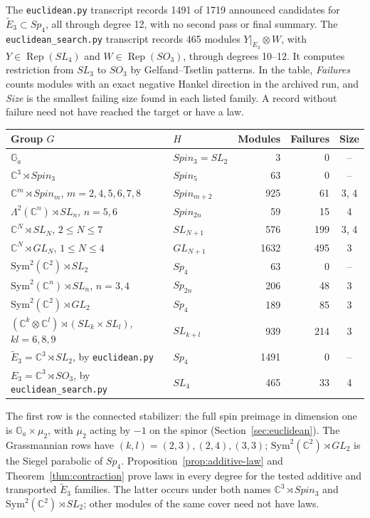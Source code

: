 \documentclass[11pt,reqno]{amsart}
\theoremstyle{definition}
\newcommand{\CC}{\mathbb C}
\newcommand{\Ga}{\mathbb G_a}
\newcommand{\Rep}{\operatorname{Rep}}
\begin{document}
The \texttt{euclidean.py} transcript records 1491 of 1719 announced candidates for $\widetilde E_3\subset Sp_4$, all through degree 12, with no second pass or final summary. The \texttt{euclidean\_search.py} transcript records 465 modules $Y|_{E_3}\otimes W$, with $Y\in\Rep(SL_4)$ and $W\in\Rep(SO_3)$, through degrees 10--12. It computes restriction from $SL_3$ to $SO_3$ by Gelfand--Tsetlin patterns. In the table, \emph{Failures} counts modules with an exact negative Hankel direction in the archived run, and \emph{Size} is the smallest failing size found in each listed family. A record without failure need not have reached the target or have a law.
\begin{center}\small
\begin{tabular}{@{}llrrc@{}}
\toprule
Group $G$ & $H$ & Modules & Failures & Size\\
\midrule
$\Ga$ & $Spin_3=SL_2$ & 3 & 0 & --\\
$\CC^3\rtimes Spin_3$ & $Spin_5$ & 63 & 0 & --\\
$\CC^m\rtimes Spin_m$, $m=2,4,5,6,7,8$ & $Spin_{m+2}$ & 925 & 61 & 3, 4\\
$\Lambda^2(\CC^n)\rtimes SL_n$, $n=5,6$ & $Spin_{2n}$ & 59 & 15 & 4\\
$\CC^N\rtimes SL_N$, $2\leq N\leq7$ & $SL_{N+1}$ & 576 & 199 & 3, 4\\
$\CC^N\rtimes GL_N$, $1\leq N\leq4$ & $GL_{N+1}$ & 1632 & 495 & 3\\
$\mathrm{Sym}^2(\CC^2)\rtimes SL_2$ & $Sp_4$ & 63 & 0 & --\\
$\mathrm{Sym}^2(\CC^n)\rtimes SL_n$, $n=3,4$ & $Sp_{2n}$ & 206 & 48 & 3\\
$\mathrm{Sym}^2(\CC^2)\rtimes GL_2$ & $Sp_4$ & 189 & 85 & 3\\
$(\CC^k\otimes\CC^l)\rtimes(SL_k\times SL_l)$, $kl=6,8,9$ & $SL_{k+l}$ & 939 & 214 & 3\\
$\widetilde E_3=\CC^3\rtimes SL_2$, by \texttt{euclidean.py} & $Sp_4$ & 1491 & 0 & --\\
$E_3=\CC^3\rtimes SO_3$, by \texttt{euclidean\_search.py} & $SL_4$ & 465 & 33 & 4\\
\bottomrule
\end{tabular}
\end{center}
The first row is the connected stabilizer: the full spin preimage in dimension one is $\Ga\times\mu_2$, with $\mu_2$ acting by $-1$ on the spinor (Section~\ref{sec:euclidean}). The Grassmannian rows have $(k,l)=(2,3),(2,4),(3,3)$; $\mathrm{Sym}^2(\CC^2)\rtimes GL_2$ is the Siegel parabolic of $Sp_4$. Proposition~\ref{prop:additive-law} and Theorem~\ref{thm:contraction} prove laws in every degree for the tested additive and transported $\widetilde E_3$ families. The latter occurs under both names $\CC^3\rtimes Spin_3$ and $\mathrm{Sym}^2(\CC^2)\rtimes SL_2$; other modules of the same cover need not have laws.
\end{document}
